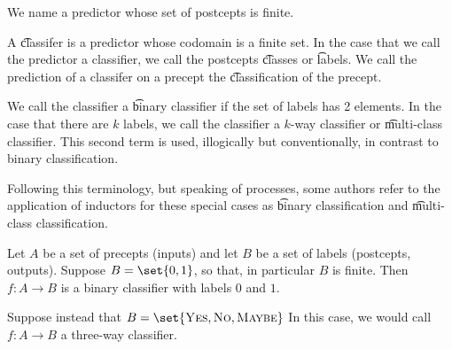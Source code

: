 

We name a predictor whose set of postcepts is finite.


A \t{classifer} is a predictor whose codomain is a finite set.
In the case that we call the predictor a classifier, we call the postcepts \t{classes} or \t{labels}.
We call the prediction of a classifer on a precept the \t{classification} of the precept.

We call the classifier a \t{binary classifier} if the set of labels has 2 elements.
In the case that there are $k$ labels, we call the classifier a \t{$k$-way classifier} or \t{multi-class classifier}.
This second term is used, illogically but conventionally, in contrast to binary classification.

Following this terminology, but speaking of processes, some authors refer to the application of inductors for these special cases as \t{binary classification} and \t{multi-class classification}.


Let $A$ be a set of precepts (inputs) and let $B$ be a set of labels (postcepts, outputs).
Suppose $B = \set{0, 1}$, so that, in particular $B$ is finite.
Then $f: A \to B$ is a binary classifier with labels $0$ and $1$.


Suppose instead that $B = \set{\text{\textsc{Yes}}, \textsc{No}, \textsc{Maybe}}$
In this case, we would call $f: A \to B$ a three-way classifier.
